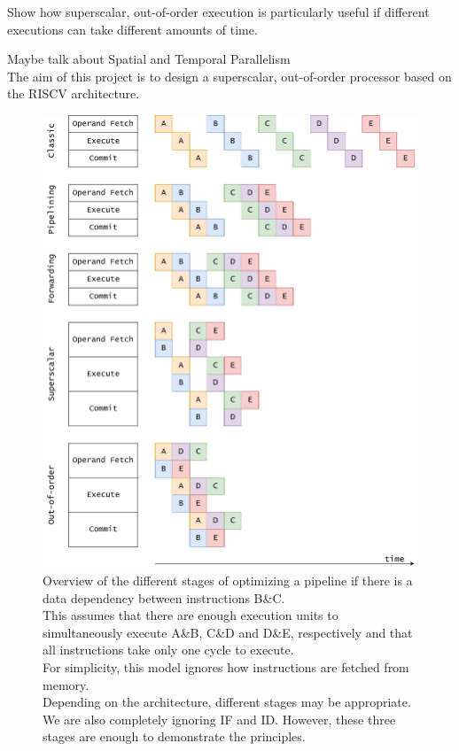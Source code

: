 \documentclass[12pt,a4paper]{article}
\newcommand{\note}{\textcolor{WildStrawberry}}
\begin{document}
\note{Show how superscalar, out-of-order execution is particularly useful if different executions can take different amounts of time.\\}

\note{Maybe talk about Spatial and Temporal Parallelism}\\

The aim of this project is to design a superscalar, out-of-order processor based on the RISCV architecture.

\begin{figure}[!p]
	\centering
	\includegraphics[width=\textwidth]{Source/ExploitingParallelismAlt.png}
	\caption{Overview of the different stages of optimizing a pipeline if there is a data dependency between instructions B\&C.\\
	This assumes that there are enough execution units to simultaneously execute A\&B, C\&D and D\&E, respectively and that all instructions take only one cycle to execute.\\
	For simplicity, this model ignores how instructions are fetched from memory.\\
	\note{Depending on the architecture, different stages may be appropriate. We are also completely ignoring IF and ID. However, these three stages are enough to demonstrate the principles.}} 
	\label{schedulingSchemes}
\end{figure}
\end{document}
